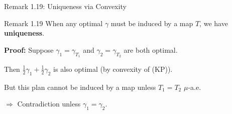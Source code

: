 \documentclass[aspectratio=169]{beamer}
\begin{document}
\begin{frame}{Remark 1.19: Uniqueness via Convexity}
\begin{block}{Remark 1.19}
When any optimal $\gamma$ must be induced by a map $T$, we have \textbf{uniqueness}.
\end{block}

\vspace{0.3cm}
\textbf{Proof:} Suppose $\gamma_1 = \gamma_{T_1}$ and $\gamma_2 = \gamma_{T_2}$ are both optimal.

\vspace{0.2cm}
Then $\frac{1}{2}\gamma_1 + \frac{1}{2}\gamma_2$ is also optimal (by convexity of (KP)).

\vspace{0.2cm}
But this plan cannot be induced by a map unless $T_1 = T_2$ $\mu$-a.e.

\vspace{0.2cm}
$\Rightarrow$ Contradiction unless $\gamma_1 = \gamma_2$.

\vspace{0.4cm}
\begin{center}
\end{center}
\end{frame}
\end{document}
